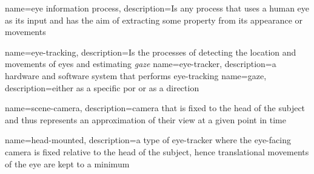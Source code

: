 \makenoidxglossaries


{
    name={eye information process},
    description={Is any process that uses a human eye as its input and has the aim of extracting some property from its appearance or movements}
}

{
    name=eye-tracking,
    description={Is the processes of detecting the location and movements of eyes and estimating \emph{gaze}}
}
{
	name=eye-tracker,
	description={a hardware and software system that performs \gls{eye-tracking}}
}
{
    name=gaze,
    description={either as a specific \acrfull{por} or as a direction}
}

{
	name=scene-camera,
	description={camera that is fixed to the head of the subject and thus represents an approximation of their view at a given point in time}
}

{
	name=head-mounted,
	description={a type of \gls{eye-tracker} where the eye-facing camera is fixed relative to the head of the subject, hence translational movements of the eye are kept to a minimum}
}




\usepackage{etoolbox}
\renewcommand\nomgroup[1]{%
  \item[\bfseries
  \ifstrequal{#1}{E}{Eye processing model sets}{%
  \ifstrequal{#1}{T}{Terminology}{%
  \ifstrequal{#1}{O}{Other Symbols}{}}}%
]}

\makenomenclature


